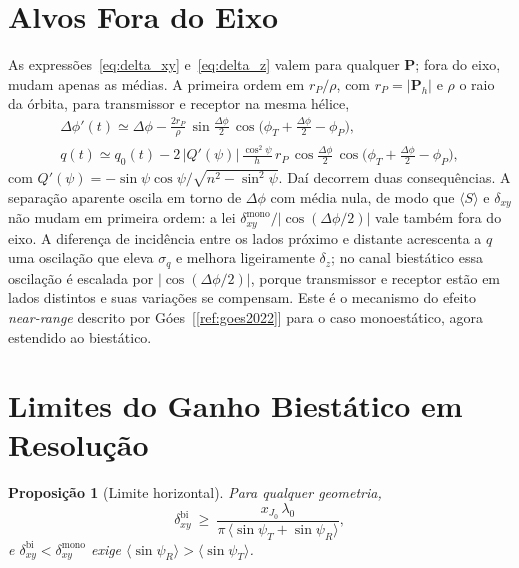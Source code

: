 \documentclass[12pt,a4paper,oneside]{book}
\theoremstyle{remark}
\newcommand{\vect}[1]{\boldsymbol{#1}}
\newcommand{\citar}[1]{[\ref{ref:#1}]}
\theoremstyle{plain}
\newtheorem{proposicao}{Proposição}[chapter]
\theoremstyle{definition}
\begin{document}
\section{Alvos Fora do Eixo}
\label{sec:res_offaxis}

As expressões~\eqref{eq:delta_xy} e~\eqref{eq:delta_z} valem para qualquer
$\vect P$; fora do eixo, mudam apenas as médias. A primeira ordem em $r_P/\rho$,
com $r_P=|\vect P_h|$ e $\rho$ o raio da órbita, para transmissor e receptor na
mesma hélice,
\begin{gather}
  \Delta\phi'(t)\simeq\Delta\phi-\frac{2r_P}{\rho}\,\sin\frac{\Delta\phi}{2}\,
  \cos\!\Big(\phi_T+\frac{\Delta\phi}{2}-\phi_P\Big),\label{eq:dphi_aparente}\\
  q(t)\simeq q_0(t)-2\,|Q'(\psi)|\,\frac{\cos^2\psi}{h}\,r_P\,
  \cos\frac{\Delta\phi}{2}\,\cos\!\Big(\phi_T+\frac{\Delta\phi}{2}-\phi_P\Big),
  \label{eq:q_aparente}
\end{gather}
com $Q'(\psi)=-\sin\psi\cos\psi/\sqrt{n^2-\sin^2\psi}$.
Daí decorrem duas consequências. A separação aparente oscila em torno de
$\Delta\phi$ com média nula, de modo que $\langle S\rangle$ e $\delta_{xy}$ não
mudam em primeira ordem: a lei $\delta_{xy}^{\text{mono}}/|\cos(\Delta\phi/2)|$
vale também fora do eixo. A diferença de incidência entre os lados próximo e
distante acrescenta a $q$ uma oscilação que eleva $\sigma_q$ e melhora
ligeiramente $\delta_z$; no canal biestático essa oscilação é escalada por
$|\cos(\Delta\phi/2)|$, porque transmissor e receptor estão em lados distintos e
suas variações se compensam. Este é o mecanismo do efeito
\textit{near-range} descrito por Góes~\citar{goes2022} para o caso monoestático,
agora estendido ao biestático.

\section{Limites do Ganho Biestático em Resolução}
\label{sec:res_limites}

\begin{proposicao}[Limite horizontal]
\label{prop:limite_xy}
Para qualquer geometria,
\begin{equation}
  \delta_{xy}^{\text{bi}}\ \ge\ \frac{x_{J_0}\,\lambda_0}{\pi\,\langle\sin\psi_T+\sin\psi_R\rangle},
\end{equation}
e $\delta_{xy}^{\text{bi}}<\delta_{xy}^{\text{mono}}$ exige
$\langle\sin\psi_R\rangle>\langle\sin\psi_T\rangle$.
\end{proposicao}
\end{document}
